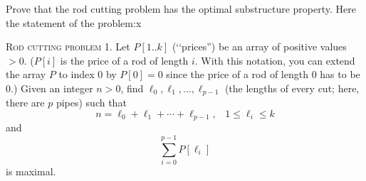 Prove that the rod cutting problem has the optimal substructure property.
Here the statement of the problem:x

\textsc{Rod cutting problem 1}.
Let $P[1..k]$ (\lq\lq prices'') be an array of positive values $>0$.
($P[i]$ is the price of a rod of length $i$. With this notation, you can
extend the array $P$ to index $0$ by
$P[0] = 0$ since the price of a rod of length 0 has to be 0.)
Given an integer $n > 0$, find $\ell_0, \ell_1, ..., \ell_{p-1}$
(the lengths of every cut; here, there are $p$ pipes) such that
\[
n = \ell_0 + \ell_1 + \cdots + \ell_{p - 1}, \,\,\,\,\,
1 \leq \ell_i \leq k
\]
and
\[
\sum_{i=0}^{p-1} P[\ell_i]
\]
is maximal.
